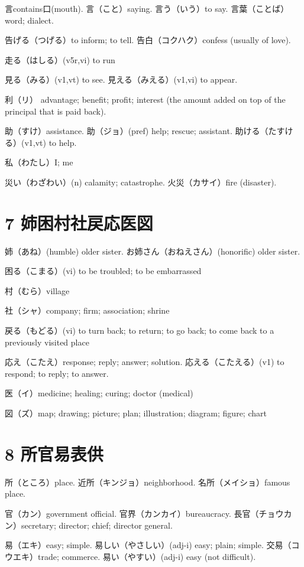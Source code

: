 言contains口(mouth).
言（こと）saying.
言う（いう）to say.
言葉（ことば）word; dialect.

告げる（つげる）to inform; to tell.
告白（コクハク）confess (usually of love).

走る（はしる）(v5r,vi) to run

見る（みる）(v1,vt) to see.
見える（みえる）(v1,vi) to appear.

利（リ）
advantage; benefit; profit;
interest (the amount added on top of the principal that is paid back).

助（すけ）assistance.
助（ジョ）(pref) help; rescue; assistant.
助ける（たすける）(v1,vt) to help.

私（わたし）I; me

災い（わざわい）(n) calamity; catastrophe.
火災（カサイ）fire (disaster).

\section{7 姉困村社戻応医図}

姉（あね）(humble) older sister.
お姉さん（おねえさん）(honorific) older sister.

困る（こまる）(vi) to be troubled; to be embarrassed

村（むら）village

社（シャ）company; firm; association; shrine

戻る（もどる）(vi) to turn back; to return; to go back;
to come back to a previously visited place

応え（こたえ）response; reply; answer; solution.
応える（こたえる）(v1) to respond; to reply; to answer.

医（イ）medicine; healing; curing; doctor (medical)

図（ズ）map; drawing; picture; plan; illustration; diagram; figure; chart

\section{8 所官易表供}

所（ところ）place.
近所（キンジョ）neighborhood.
名所（メイショ）famous place.

官（カン）government official.
官界（カンカイ）bureaucracy.
長官（チョウカン）secretary; director; chief; director general.

易（エキ）easy; simple.
易しい（やさしい）(adj-i) easy; plain; simple.
交易（コウエキ）trade; commerce.
易い（やすい）(adj-i) easy (not difficult).

